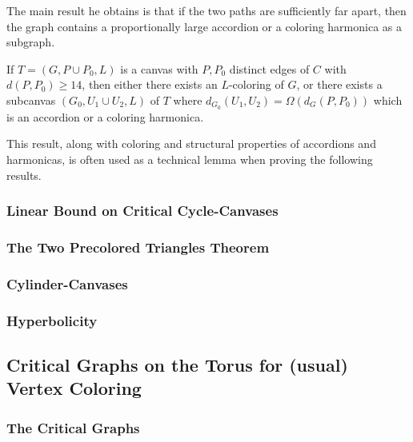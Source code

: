 The main result he obtains is that if the two paths are sufficiently far apart, then the graph contains a proportionally large accordion or a coloring harmonica as a subgraph.

\begin{theorem}
If $T = (G, P \cup P_0 , L)$ is a canvas with $P, P_0$ distinct edges of $C$ with $d(P, P_0) \geq 14$, then either there exists an $L$-coloring of $G$, or there exists a subcanvas $(G_0 , U_1 \cup U_2 , L)$ of $T$ where $d_{G_0} (U_1, U_2) = \Omega(d_G (P, P_0))$ which is an accordion or a coloring harmonica.
\end{theorem}

This result, along with coloring and structural properties of accordions and harmonicas, is often used as a technical lemma when proving the following results.

\subsubsection{Linear Bound on Critical Cycle-Canvases}

\subsubsection{The Two Precolored Triangles Theorem}

\subsubsection{Cylinder-Canvases}

\subsubsection{Hyperbolicity}

\subsection{Critical Graphs on the Torus for (usual) Vertex Coloring}

\subsubsection{The Critical Graphs}


